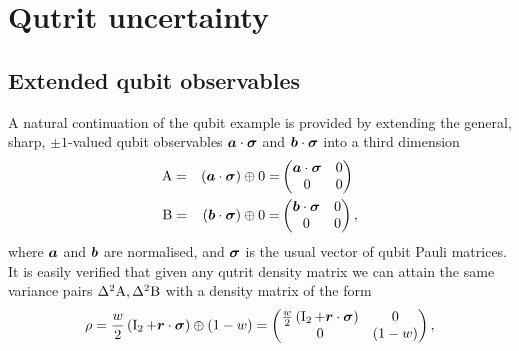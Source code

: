 
\section{Qutrit uncertainty}
\label{sec:qutrit}
\subsection{Extended qubit observables}
\label{sec:qubit-extended-uncertainty}
A natural continuation of the qubit example is provided by extending the general, sharp, $\pm 1$-valued qubit observables $\bm{a}\cdot{\boldsymbol\sigma}$ and $\bm{b}\cdot{\boldsymbol\sigma}$ into a third dimension
\begin{alignat}{3}
  \label{eqn:extended-qubit-obs-defn}
  \operatorname{A} &= &(\bm{a}\cdot{\boldsymbol\sigma}) \oplus 0 = &\begin{pmatrix}\bm{a}\cdot{\boldsymbol\sigma} & 0\\ 0 &0\\\end{pmatrix}\\
  \operatorname{B} &= &(\bm{b}\cdot{\boldsymbol\sigma}) \oplus 0 = &\begin{pmatrix}\bm{b}\cdot{\boldsymbol\sigma} & 0\\ 0 &0\\\end{pmatrix},
\end{alignat}
where $\bm{a}$ and $\bm{b}$ are normalised, and ${\boldsymbol\sigma}$ is the usual vector of qubit Pauli matrices. It is easily verified that given any qutrit density matrix we can attain the same variance pairs $\var{\opa}, \var{\opb}$ with a density matrix of the form
\begin{align}
  \rho =\frac{w}{2}\left(\operatorname{I}_2 + \bm{r}\cdot{\boldsymbol\sigma}\right) \oplus (1-w)=\begin{pmatrix}\frac{w}{2}\left(\operatorname{I}_2 + \bm{r}\cdot{\boldsymbol\sigma}\right) & 0 \\ 0& (1-w)\end{pmatrix},
\end{align}
